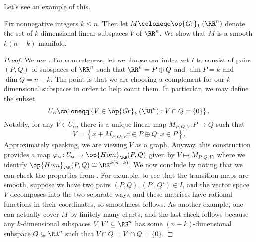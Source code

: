 \documentclass[../notes.tex]{subfiles}
\begin{document}
Let's see an example of this.
\begin{exe}
	Fix nonnegative integers $k\le n$. Then let $M\coloneqq\op{Gr}_k\left(\RR^n\right)$ denote the set of $k$-dimensional linear subspaces $V$ of $\RR^n$. We show that $M$ is a smooth $k(n-k)$-manifold.
\end{exe}
\begin{proof}
	We use . For concreteness, let we choose our index set $I$ to consist of pairs $(P,Q)$ of subspaces of $\RR^n$ such that $\RR^n=P\oplus Q$ and $\dim P=k$ and $\dim Q=n-k$. The point is that we are choosing a complement for our $k$-dimensional subspaces in order to help count them. In particular, we may define the subset
	\[U_\alpha\coloneqq\left\{V\in\op{Gr}_k\left(\RR^n\right):V\cap Q=\{0\}\right\}.\]
	Notably, for any $V\in U_\alpha$, there is a unique linear map $M_{P,Q,V}\colon P\to Q$ such that
	\[V=\left\{x+M_{P,Q,V}x\in P\oplus Q:x\in P\right\}.\]
	Approximately speaking, we are viewing $V$ as a graph. Anyway, this construction provides a map $\varphi_\alpha\colon U_\alpha\to\op{Hom}_\RR(P,Q)$ given by $V\mapsto M_{P,Q,V}$, where we identify $\op{Hom}_\RR(P,Q)\cong\RR^{k(n-k)}$. We now conclude by noting that we can check the properties from . For example, to see that the transition maps are smooth, suppose we have two pairs $(P,Q),(P',Q')\in I$, and the vector space $V$ decomposes into the two separate ways, and these matrices have rational functions in their coordinates, so smoothness follows. As another example, one can actually cover $M$ by finitely many charts, and the last check follows because any $k$-dimensional subspaces $V,V'\subseteq\RR^n$ has some $(n-k)$-dimensional subspace $Q\subseteq\RR^n$ such that $V\cap Q=V'\cap Q=\{0\}$.
\end{proof}
\end{document}
